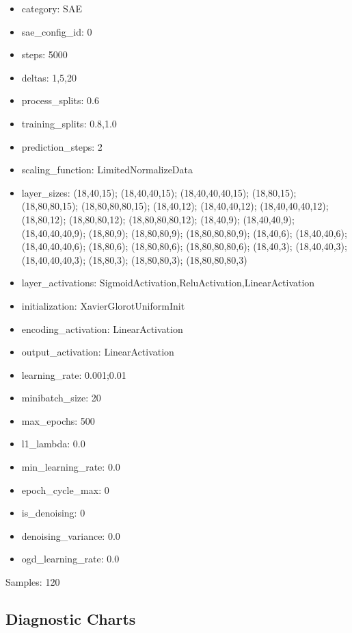 \documentclass[a4paper,11pt,oneside]{article}
\theoremstyle{plain}
\theoremstyle{definition}
\begin{document}
	\begin{itemize}
		\item category: SAE
		\item sae\_config\_id: 0
		\item steps: 5000
		\item deltas: 1,5,20
		\item process\_splits: 0.6
		\item training\_splits: 0.8,1.0
		\item prediction\_steps: 2
		\item scaling\_function: LimitedNormalizeData
		\item layer\_sizes: (18,40,15); (18,40,40,15); (18,40,40,40,15); (18,80,15); (18,80,80,15); (18,80,80,80,15); (18,40,12); (18,40,40,12); (18,40,40,40,12); (18,80,12); (18,80,80,12); (18,80,80,80,12); (18,40,9); (18,40,40,9); (18,40,40,40,9); (18,80,9); (18,80,80,9); (18,80,80,80,9); (18,40,6); (18,40,40,6); (18,40,40,40,6); (18,80,6); (18,80,80,6); (18,80,80,80,6); (18,40,3); (18,40,40,3); (18,40,40,40,3); (18,80,3); (18,80,80,3); (18,80,80,80,3)
		\item layer\_activations: SigmoidActivation,ReluActivation,LinearActivation
		\item initialization: XavierGlorotUniformInit
		\item encoding\_activation: LinearActivation
		\item output\_activation: LinearActivation
		\item learning\_rate: 0.001;0.01
		\item minibatch\_size: 20
		\item max\_epochs: 500
		\item l1\_lambda: 0.0
		\item min\_learning\_rate: 0.0
		\item epoch\_cycle\_max: 0
		\item is\_denoising: 0
		\item denoising\_variance: 0.0
		\item ogd\_learning\_rate: 0.0
	\end{itemize}
	
	Samples: 120
	
	\newpage
	\subsection{Diagnostic Charts}\label{appendix_diagnostics}
	
\end{document}

